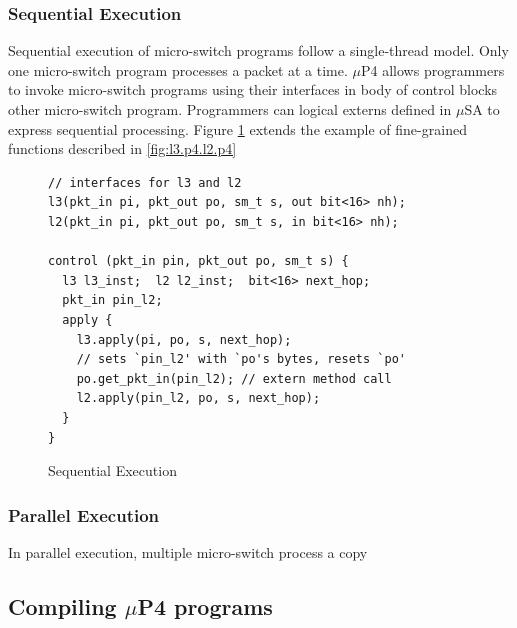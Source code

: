 \subsubsection{Sequential Execution}
Sequential execution of micro-switch programs follow a single-thread model.
Only one micro-switch program processes a packet at a time.
$\mu$P4 allows programmers to invoke micro-switch programs using their interfaces in body of control blocks other micro-switch program.
Programmers can logical externs defined in $\mu$SA to express sequential processing.
Figure \ref{fig:sequential-execution} extends the example of fine-grained functions described in \ref{fig:l3.p4.l2.p4}
 \begin{figure}[ht]
\begin{lstlisting}[frame=none]
// interfaces for l3 and l2
l3(pkt_in pi, pkt_out po, sm_t s, out bit<16> nh);
l2(pkt_in pi, pkt_out po, sm_t s, in bit<16> nh);

control (pkt_in pin, pkt_out po, sm_t s) {
  l3 l3_inst;  l2 l2_inst;  bit<16> next_hop;
  pkt_in pin_l2;
  apply {
    l3.apply(pi, po, s, next_hop);
    // sets `pin_l2' with `po's bytes, resets `po'
    po.get_pkt_in(pin_l2); // extern method call
    l2.apply(pin_l2, po, s, next_hop);
  }
}
\end{lstlisting}
\caption{Sequential Execution}
\label{fig:sequential-execution}
\end{figure}






\subsubsection{Parallel Execution}
In parallel execution, multiple micro-switch process a copy 

\subsection{Compiling $\mu$P4 programs}




